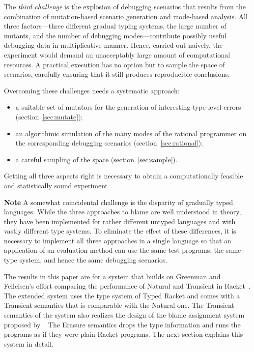 The {\em third challenge\/} is the explosion of debugging scenarios that results
from the combination of mutation-based scenario generation and mode-based
analysis. All three factors---three different gradual typing systems, the large
number of mutants, and the number of debugging modes---contribute possibly
useful debugging data in multiplicative manner. Hence, carried out naively, the
experiment would demand an unacceptably large amount of computational resources.
A practical execution has no option but to sample the space of scenarios,
carefully ensuring that it still produces reproducible conclusions.

Overcoming these challenges needs a systematic approach: 
\begin{itemize}

\item a suitable set of mutators for the generation of interesting type-level
 errors (section~\ref{sec:mutate});
    
\item an algorithmic simulation of the many modes of the rational programmer on
 the corresponding debugging scenarios (section~\ref{sec:rational});

\item a careful sampling of the space (section~\ref{sec:sample}).
\end{itemize}
Getting all three aspects right is necessary to obtain a computationally
feasible and statistically sound experiment

{\bf Note} A somewhat coincidental challenge is the disparity of gradually typed
languages. While the three approaches to blame are well understood in theory,
they have been implemented for rather different untyped languages and with
vastly different type systems. To eliminate the effect of these differences, it
is necessary to implement all three approaches in a single language so that an
application of an evaluation method can use the same test programs, the same
type system, and hence the same debugging scenarios.

The results in this paper are for a system that builds on Greenman and
Felleisen's effort comparing the performance of Natural and Transient in
Racket~\cite{gf-icfp-2018}. The extended system uses the type system of Typed
Racket and comes with a Transient semantics that is comparable with the Natural
one. The Transient semantics of the system also realizes the design of the blame
assignment system proposed by~\cite{vss-popl-2017}. The Erasure semantics drops
the type information and runs the programs as if they were plain Racket
programs. The next section explains this system in detail.

